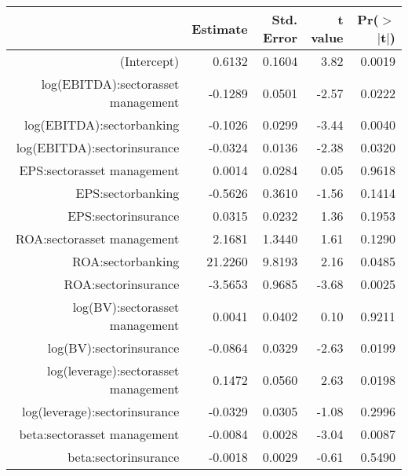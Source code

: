 \begin{table}[ht]
\centering
\begin{tabular}{rrrrr}
  \hline
 & Estimate & Std. Error & t value & Pr($>$$|$t$|$) \\ 
  \hline
(Intercept) & 0.6132 & 0.1604 & 3.82 & 0.0019 \\ 
  log(EBITDA):sectorasset management & -0.1289 & 0.0501 & -2.57 & 0.0222 \\ 
  log(EBITDA):sectorbanking & -0.1026 & 0.0299 & -3.44 & 0.0040 \\ 
  log(EBITDA):sectorinsurance & -0.0324 & 0.0136 & -2.38 & 0.0320 \\ 
  EPS:sectorasset management & 0.0014 & 0.0284 & 0.05 & 0.9618 \\ 
  EPS:sectorbanking & -0.5626 & 0.3610 & -1.56 & 0.1414 \\ 
  EPS:sectorinsurance & 0.0315 & 0.0232 & 1.36 & 0.1953 \\ 
  ROA:sectorasset management & 2.1681 & 1.3440 & 1.61 & 0.1290 \\ 
  ROA:sectorbanking & 21.2260 & 9.8193 & 2.16 & 0.0485 \\ 
  ROA:sectorinsurance & -3.5653 & 0.9685 & -3.68 & 0.0025 \\ 
  log(BV):sectorasset management & 0.0041 & 0.0402 & 0.10 & 0.9211 \\ 
  log(BV):sectorinsurance & -0.0864 & 0.0329 & -2.63 & 0.0199 \\ 
  log(leverage):sectorasset management & 0.1472 & 0.0560 & 2.63 & 0.0198 \\ 
  log(leverage):sectorinsurance & -0.0329 & 0.0305 & -1.08 & 0.2996 \\ 
  beta:sectorasset management & -0.0084 & 0.0028 & -3.04 & 0.0087 \\ 
  beta:sectorinsurance & -0.0018 & 0.0029 & -0.61 & 0.5490 \\ 
   \hline
\end{tabular}
\end{table}
